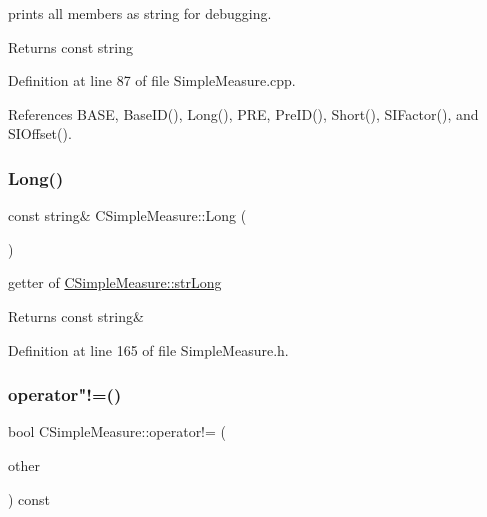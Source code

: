 prints all members as string for debugging. 

\begin{DoxyReturn}{Returns}
const string 
\end{DoxyReturn}


Definition at line 87 of file Simple\+Measure.\+cpp.



References B\+A\+SE, Base\+I\+D(), Long(), P\+RE, Pre\+I\+D(), Short(), S\+I\+Factor(), and S\+I\+Offset().

\mbox{\label{classCSimpleMeasure_a62d318d474f4feb9b25e113f47dd45c6}} 
\subsubsection{\texorpdfstring{Long()}{Long()}}
{\footnotesize\ttfamily const string\& C\+Simple\+Measure\+::\+Long (\begin{DoxyParamCaption}\item[{void}]{ }\end{DoxyParamCaption})\hspace{0.3cm}{\ttfamily [inline]}}



getter of \hyperlink{classCSimpleMeasure_a5761fb46fb35ce577066ef1e7ec1ab2e}{C\+Simple\+Measure\+::str\+Long} 

\begin{DoxyReturn}{Returns}
const string\& 
\end{DoxyReturn}


Definition at line 165 of file Simple\+Measure.\+h.

\mbox{\label{classCSimpleMeasure_a157b4e0af2843d8fb5c369b92cfd7c1f}} 
\subsubsection{\texorpdfstring{operator"!=()}{operator!=()}}
{\footnotesize\ttfamily bool C\+Simple\+Measure\+::operator!= (\begin{DoxyParamCaption}\item[{const \hyperlink{classCSimpleMeasure}{C\+Simple\+Measure} \&}]{other }\end{DoxyParamCaption}) const}



